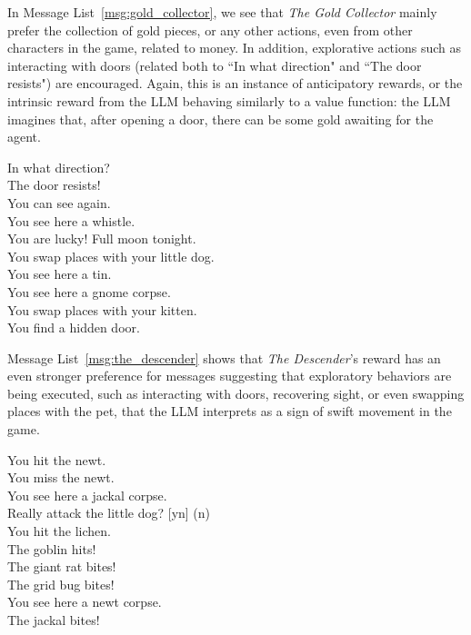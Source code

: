 \documentclass{article} %
\begin{document}
In Message List~\ref{msg:gold_collector}, we see that \emph{The Gold Collector} mainly prefer the collection of gold pieces, or any other actions, even from other characters in the game, related to money. 
In addition, explorative actions such as interacting with doors (related both to ``In what direction" and ``The door resists") are encouraged.
Again, this is an instance of anticipatory rewards, or the intrinsic reward from the LLM behaving similarly to a value function: the LLM imagines that, after opening a door, there can be some gold awaiting for the agent.


\begin{messages}[h]
\begin{mymessagebox}[frametitle=Relatively most preferred messages for \textit{The Descender}]
\small{}\selectfont
In what direction?\\
The door resists!\\
You can see again.\\
You see here a whistle.\\
You are lucky!  Full moon tonight.\\
You swap places with your little dog.\\
You see here a tin.\\
You see here a gnome corpse.\\
You swap places with your kitten.\\
You find a hidden door.\\
\end{mymessagebox}
\caption{Messages more emphasized by the prompt used by \emph{The Descender} compared to the baseline prompt.}
\label{msg:the_descender}
\end{messages}

Message List~\ref{msg:the_descender} shows that \emph{The Descender}'s reward has an even stronger preference for messages suggesting that exploratory behaviors are being executed, such as interacting with doors, recovering sight, or even swapping places with the pet, that the LLM interprets as a sign of swift movement in the game.

\begin{messages}
\begin{mymessagebox}[frametitle=Relatively most preferred messages for \textit{The Monster Slayer}]
\small{}\selectfont
You hit the newt. \\
You miss the newt.\\
You see here a jackal corpse.\\
Really attack the little dog? [yn] (n) \\
You hit the lichen.\\
The goblin hits!\\
The giant rat bites!\\
The grid bug bites!\\
You see here a newt corpse.\\
The jackal bites!\\
\end{mymessagebox}
\caption{Messages more emphasized by the prompt used by \emph{The Monster Slayer} compared to the baseline prompt.}
\label{msg:the_monster_slayer}
\end{messages}
\end{document}
